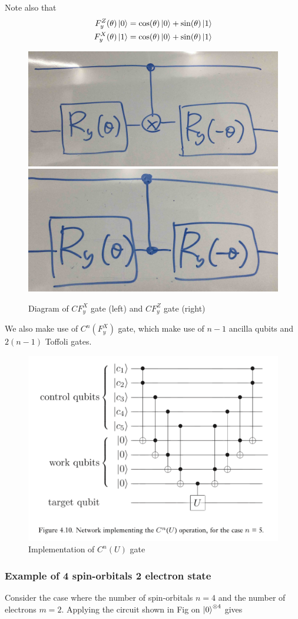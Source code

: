 \documentclass[11pt, oneside]{article}   	%
\begin{document}
Note also that
\begin{align}
F^Z_y (\theta) \ket{0} &= \cos(\theta) \ket{0} + \sin(\theta) \ket{1} \\
F^X_y (\theta) \ket{1} &= \cos(\theta) \ket{0} + \sin(\theta) \ket{1}
\end{align}

\begin{figure}
\includegraphics[width=0.5 \linewidth]{figs/fig_CFX_gate}
\includegraphics[width=0.5 \linewidth]{figs/fig_CFZ_gate}
\caption{Diagram of $CF^X_y$ gate (left) and $CF^Z_y$ gate (right)}
\end{figure}

We also make use of $C^n(F^X_y)$ gate, which make use of $n-1$ ancilla qubits and $2 (n-1)$ Toffoli gates.
\begin{figure}
\centering
\includegraphics[width=0.5 \linewidth]{figs/fig_Cn_U_gate}
\caption{Implementation of $C^n (U)$ gate}
\end{figure}

\subsubsection{Example of 4 spin-orbitals 2 electron state}
Consider the case where the number of spin-orbitals $n = 4$ and the number of electrons $m = 2$.
Applying the circuit shown in Fig on $\ket{0}^{\otimes 4}$ gives
\end{document}
